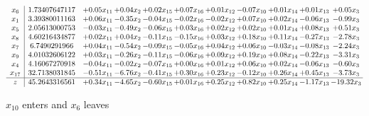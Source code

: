 \documentclass[9pt]{article}
\begin{document}
 \[\begin{array}{c| c c@{\hskip 2pt} c@{\hskip 2pt} c@{\hskip 2pt} c@{\hskip 2pt} c@{\hskip 2pt} c@{\hskip 2pt} c@{\hskip 2pt} c@{\hskip 2pt} c@{\hskip 2pt} }
 x_{6}   &  1.73407647117 & +  0.05 x_{11} & +  0.04 x_{2} & +  0.02 x_{15} & +  0.07 x_{16} & +  0.01 x_{12} & -0.07 x_{10} & +  0.01 x_{14} & +  0.01 x_{13} & +  0.05 x_{3}\\
 x_{1}   &  3.39380011163 & +  0.06 x_{11} & -0.35 x_{2} & -0.04 x_{15} & -0.02 x_{16} & -0.02 x_{12} & +  0.07 x_{10} & +  0.02 x_{14} & -0.06 x_{13} & -0.99 x_{3}\\
 x_{5}   &  2.05613000753 & -0.03 x_{11} & -0.49 x_{2} & -0.06 x_{15} & +  0.03 x_{16} & +  0.02 x_{12} & +  0.02 x_{10} & +  0.01 x_{14} & +  0.08 x_{13} & +  0.51 x_{3}\\
 x_{8}   &  4.60216434877 & +  0.02 x_{11} & +  0.04 x_{2} & -0.11 x_{15} & -0.15 x_{16} & +  0.03 x_{12} & +  0.18 x_{10} & +  0.11 x_{14} & -0.27 x_{13} & -2.78 x_{3}\\
 x_{7}   &  6.7490291966 & +  0.04 x_{11} & -0.54 x_{2} & -0.09 x_{15} & -0.05 x_{16} & +  0.04 x_{12} & +  0.06 x_{10} & -0.03 x_{14} & -0.08 x_{13} & -2.24 x_{3}\\
 x_{9}   &  4.01032606122 & +  0.03 x_{11} & -0.26 x_{2} & -0.11 x_{15} & -0.06 x_{16} & +  0.09 x_{12} & +  0.19 x_{10} & +  0.08 x_{14} & -0.22 x_{13} & -3.31 x_{3}\\
 x_{4}   &  4.16067270918 & -0.04 x_{11} & -0.02 x_{2} & -0.07 x_{15} & +  0.00 x_{16} & +  0.01 x_{12} & +  0.06 x_{10} & +  0.02 x_{14} & -0.06 x_{13} & -0.60 x_{3}\\
 x_{17}   &  32.7138031845 & -0.51 x_{11} & -6.76 x_{2} & -0.41 x_{15} & +  0.30 x_{16} & +  0.23 x_{12} & -0.12 x_{10} & +  0.26 x_{14} & +  0.45 x_{13} & -3.73 x_{3}\\
\hline
z    &  45.2643316561 & +  0.34 x_{11} & -4.65 x_{2} & -0.60 x_{15} & +  0.01 x_{16} & +  0.25 x_{12} & +  0.82 x_{10} & +  0.25 x_{14} & -1.17 x_{13} & -19.32 x_{3}\\
\end{array}\]


 $ x_{10} $ enters and $ x_{6} $ leaves 
\end{document}
